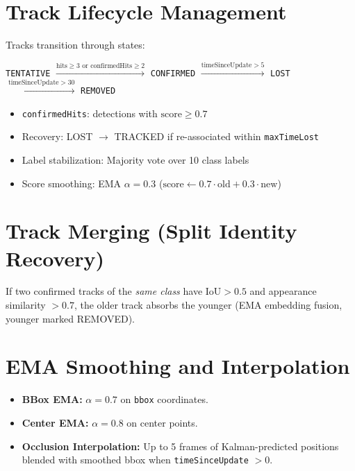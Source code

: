 \section{Track Lifecycle Management}
\label{sec:lifecycle}

Tracks transition through states:

\begin{center}
\texttt{TENTATIVE} $\xrightarrow{\text{hits} \ge 3 \text{ or } \text{confirmedHits} \ge 2}$ \texttt{CONFIRMED} $\xrightarrow{\text{timeSinceUpdate} > 5}$ \texttt{LOST} $\xrightarrow{\text{timeSinceUpdate} > 30}$ \texttt{REMOVED}
\end{center}

\begin{itemize}
    \item \texttt{confirmedHits}: detections with $\text{score} \ge 0.7$
    \item Recovery: LOST $\to$ TRACKED if re-associated within \texttt{maxTimeLost}
    \item Label stabilization: Majority vote over 10 class labels
    \item Score smoothing: EMA $\alpha=0.3$ ($\text{score} \leftarrow 0.7 \cdot \text{old} + 0.3 \cdot \text{new}$)
\end{itemize}

\section{Track Merging (Split Identity Recovery)}
\label{sec:merging}

If two confirmed tracks of the \textit{same class} have $\text{IoU} > 0.5$ and appearance similarity $> 0.7$, the older track absorbs the younger (EMA embedding fusion, younger marked REMOVED).

\section{EMA Smoothing and Interpolation}
\label{sec:smoothing}

\begin{itemize}
    \item \textbf{BBox EMA:} $\alpha=0.7$ on \texttt{bbox} coordinates.
    \item \textbf{Center EMA:} $\alpha=0.8$ on center points.
    \item \textbf{Occlusion Interpolation:} Up to 5 frames of Kalman-predicted positions blended with smoothed bbox when \texttt{timeSinceUpdate} $> 0$.
\end{itemize}

